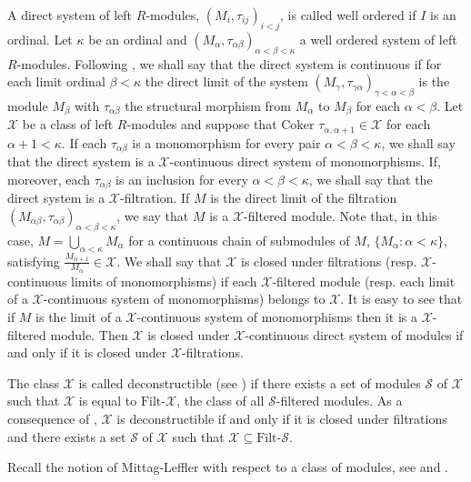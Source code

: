 \documentclass[a4paper,10pt]{amsart}
\begin{document}
A direct system of left $R$-modules, $(M_i,\tau_{ij})_{i < j}$, is
called well ordered if $I$ is an ordinal. Let $\kappa$ be an ordinal
and $(M_\alpha,\tau_{\alpha\beta})_{\alpha<\beta<\kappa}$ a well
ordered system of left $R$-modules. Following \cite[Definition
3.1.1]{GobelTrlifaj}, we shall say that the direct system is
continuous if for each limit ordinal $\beta < \kappa$ the direct limit
of the system $(M_\gamma,\tau_{\gamma\alpha})_{\gamma < \alpha <
  \beta}$ is the module $M_\beta$ with $\tau_{\alpha\beta}$ the
structural morphism from $M_\alpha$ to $M_\beta$ for each $\alpha <
\beta$. Let $\mathcal X$ be a class of left $R$-modules and suppose
that ${\textrm{Coker }} \tau_{\alpha,\alpha+1} \in \mathcal X$ for each $\alpha+1
< \kappa$. If each $\tau_{\alpha \beta}$ is a monomorphism for every
pair $\alpha < \beta < \kappa$, we shall say that the direct system is
a $\mathcal X$-continuous direct system of monomorphisms. If,
moreover, each $\tau_{\alpha\beta}$ is an inclusion for every $\alpha
< \beta < \kappa$, we shall say that the direct system is a $\mathcal
X$-filtration. If $M$ is the direct limit of the filtration
$(M_{\alpha\beta},\tau_{\alpha\beta})_{\alpha < \beta < \kappa}$, we
say that $M$ is a $\mathcal X$-filtered module. Note that, in this
case, $M=\bigcup_{\alpha < \kappa}M_\alpha$ for a continuous chain of
submodules of $M$, $\{M_\alpha:\alpha < \kappa\}$, satisfying
$\frac{M_{\alpha+1}}{M_\alpha} \in \mathcal X$. We shall say that
$\mathcal X$ is closed under filtrations (resp. $\mathcal
X$-continuous limits of monomorphisms) if each $\mathcal X$-filtered
module (resp. each limit of a $\mathcal X$-continuous system of
monomorphisms) belongs to $\mathcal X$. It is easy to see that if $M$
is the limit of a $\mathcal X$-continuous system of monomorphisms then
it is a $\mathcal X$-filtered module. Then $\mathcal X$ is closed
under $\mathcal X$-continuous direct system of modules if and only if
it is closed under $\mathcal X$-filtrations.

The class $\mathcal X$ is called deconstructible (see \cite[Definition
1.4]{Stovicek}) if there exists a set of modules $\mathcal S$ of
$\mathcal X$ such that $\mathcal X$ is equal to
$\textrm{Filt-}\mathcal X$, the class of all $\mathcal S$-filtered
modules. As a consequence of \cite[Lemma 1.6]{Stovicek}, $\mathcal X$
is deconstructible if and only if it is closed under filtrations and
there exists a set $\mathcal S$ of $\mathcal X$ such that $\mathcal X
\subseteq {\textrm{Filt-}}\mathcal S$.

Recall the notion of Mittag-Leffler with respect to a class of
modules, see \cite{Rothmaler} and \cite{AngeleriHerbera}.
\end{document}
